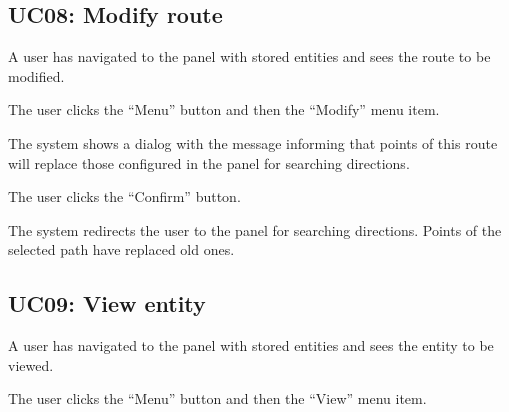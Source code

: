 \subsection{UC08: Modify route}\label{sssec:uc-modify-route}


\begin{ucitemize}
\item A user has navigated to the panel with stored entities and sees the route to be modified.
\end{ucitemize}


\begin{ucenumerate}
\item The user clicks the ``Menu'' button and then the ``Modify'' menu item.
\item The system shows a dialog with the message informing that points of this route will replace those configured in the panel for searching directions.
\item The user clicks the ``Confirm'' button.
\end{ucenumerate}


\begin{ucitemize}
\item The system redirects the user to the panel for searching directions. Points of the selected path have replaced old ones.
\end{ucitemize}

\subsection{UC09: View entity}\label{sssec:uc-view-entity}


\begin{ucitemize}
\item A user has navigated to the panel with stored entities and sees the entity to be viewed.
\end{ucitemize}


\begin{ucenumerate}
\item The user clicks the ``Menu'' button and then the ``View'' menu item.
\end{ucenumerate}


